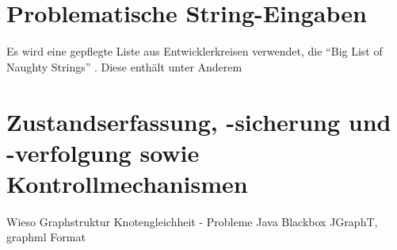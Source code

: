 \section{Problematische String-Eingaben}\label{section:naughtystrings}

Es wird eine gepflegte Liste aus Entwicklerkreisen verwendet, die ``Big List of Naughty Strings'' 
\cite{website:naughty-strings}. Diese enthält unter Anderem


\section{Zustandserfassung, -sicherung und -verfolgung sowie Kontrollmechanismen}\label{section:statemonitoring}

Wieso Graphstruktur
Knotengleichheit - Probleme Java Blackbox
JGraphT, graphml Format

